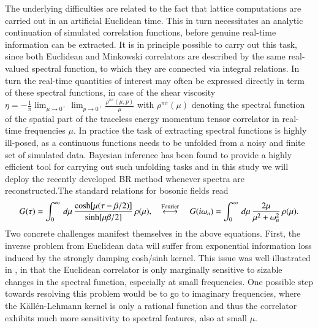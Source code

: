 \documentclass[epj]{webofc}
\begin{document}
The underlying difficulties are related to the fact that lattice computations are carried out in an artificial Euclidean time. This in turn necessitates an analytic continuation of simulated correlation functions, before genuine real-time information can be extracted. It is in principle possible to carry out this task, since both Euclidean and Minkowski correlators are described by the same real-valued spectral function, to which they are connected via integral relations. In turn the real-time quantities of interest may often be expressed directly in term of these spectral functions, in case of the shear viscosity $\eta=-\frac{1}{\pi} \lim_{\mu\to0^+}\lim_{p\to0^+} \frac{\rho^{\pi\pi}(\mu,p)}{\mu}$
with $\rho^{\pi\pi}(\mu)$ denoting the spectral function of the spatial part of the traceless energy momentum tensor correlator in real-time frequencies $\mu$. In practice the task of extracting spectral functions is highly ill-posed, as a continuous functions needs to be unfolded from a noisy and finite set of simulated data. Bayesian inference has been found to provide a highly efficient tool for carrying out such unfolding tasks and in this study we will deploy the recently developed BR method \cite{Burnier:2013nla} whenever spectra are reconstructed.The standard relations for bosonic fields read
\begin{align}
G(\tau)=\int_0^\infty \,d\mu \, \frac{{\rm cosh}[\mu(\tau-\beta/2)]}{{\rm sinh}[\mu \beta/2]}\,\rho(\mu), \quad \overset{{\rm Fourier }}{\longleftrightarrow} \quad  G(i\omega_n)=\int_0^\infty \,d\mu\,\frac{2\mu}{\mu^2+\omega_n^2}\,\rho(\mu).\label{eq:CorrSpecRel}
\end{align}
Two concrete challenges manifest themselves in the above equations. First, the inverse problem from Euclidean data will suffer from exponential information loss induced by the strongly damping cosh/sinh kernel. This issue was well illustrated in \cite{Pasztor:2016wxq}, in that the Euclidean correlator is only marginally sensitive to sizable changes in the spectral function, especially at small frequencies. One possible step towards resolving this problem would be to go to imaginary frequencies, where the K\"all\'en-Lehmann kernel is only a rational function and thus the correlator exhibits much more sensitivity to spectral features, also at small $\mu$.
\end{document}
